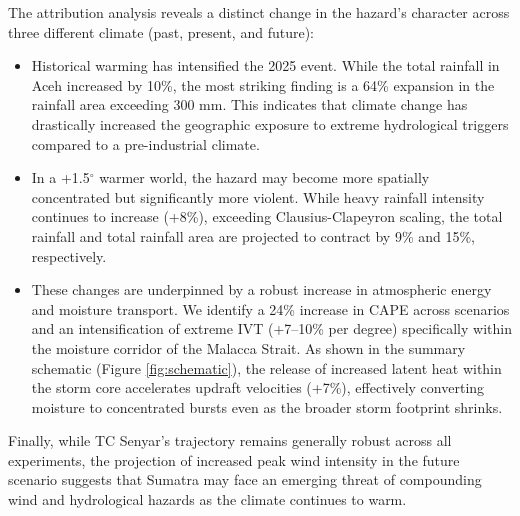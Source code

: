 The attribution analysis reveals a distinct change in the hazard's character across three different climate (past, present, and future):
\begin{itemize}
    \item Historical warming has intensified the 2025 event. While the total rainfall in Aceh increased by 10\%, the most striking finding is a 64\% expansion in the rainfall area exceeding 300 mm. This indicates that climate change has drastically increased the geographic exposure to extreme hydrological triggers compared to a pre-industrial climate.
    \item In a +1.5$^\circ$ warmer world, the hazard may become more spatially concentrated but significantly more violent. While heavy rainfall intensity continues to increase (+8\%), exceeding Clausius-Clapeyron scaling, the total rainfall and total rainfall area are projected to contract by 9\% and 15\%, respectively.
    \item These changes are underpinned by a robust increase in atmospheric energy and moisture transport. We identify a 24\% increase in CAPE across scenarios and an intensification of extreme IVT (+7–10\% per degree) specifically within the moisture corridor of the Malacca Strait. As shown in the summary schematic (Figure \ref{fig:schematic}), the release of increased latent heat within the storm core accelerates updraft velocities (+7\%), effectively converting moisture to concentrated bursts even as the broader storm footprint shrinks.
\end{itemize}

Finally, while TC Senyar’s trajectory remains generally robust across all experiments, the projection of increased peak wind intensity in the future scenario suggests that Sumatra may face an emerging threat of compounding wind and hydrological hazards as the climate continues to warm.

